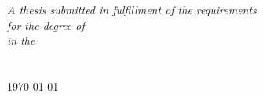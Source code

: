 \begin{titlepage}
\begin{center}
\large \textit{A thesis submitted in fulfillment of the requirements\\ for the degree of \degreename}\\[0.3cm] %
\textit{in the}\\[0.4cm]
\groupname\\\deptname\\[2cm] %
 
{\large \today}\\[4cm] %
 
\vfill
\end{center}
\end{titlepage}






\tableofcontents


\mainmatter %

\pagestyle{thesis} %

\adjustmtc















